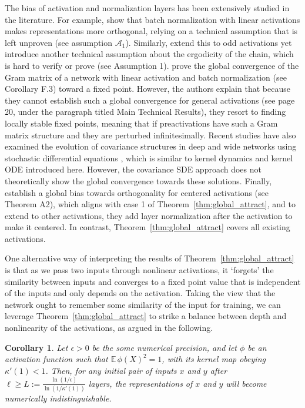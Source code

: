 \documentclass[twoside]{article}
\newcommand{\E}{\mathbb{E}\,}
\newtheorem{corollary}{Corollary}
\theoremstyle{definition}
\begin{document}
The bias of activation and normalization layers has been extensively studied in the literature. For example, \citet{daneshmand2021batch} show that batch normalization with linear activations makes representations more orthogonal, relying on a technical assumption that is left unproven (see assumption $\mathcal{A}_1$). Similarly, \citet{joudaki2023bridging} extend this to odd activations yet introduce another technical assumption about the ergodicity of the chain, which is hard to verify or prove (see Assumption 1). \citet{yang2019meanfield} prove the global convergence of the Gram matrix of a network with linear activation and batch normalization (see Corollary F.3) toward a fixed point. However, the authors explain that because they cannot establish such a global convergence for general activations (see page 20, under the paragraph titled Main Technical Results), they resort to finding locally stable fixed points, meaning that if preactivations have such a Gram matrix structure and they are perturbed infinitesimally. Recent studies have also examined the evolution of covariance structures in deep and wide networks using stochastic differential equations \citep{li2022neural}, which is similar to kernel dynamics and kernel ODE introduced here. However, the covariance SDE approach does not theoretically show the global convergence towards these solutions. Finally, \citet{joudaki2023impact} establish a global bias towards orthogonality for centered activations (see Theorem A2), which aligns with case 1 of Theorem~\ref{thm:global_attract}, and to extend to other activations, they add layer normalization after the activation to make it centered. In contrast, Theorem~\ref{thm:global_attract} covers all existing activations. 

One alternative way of interpreting the results of Theorem~\ref{thm:global_attract} is that as we pass two inputs through nonlinear activations, it `forgets' the similarity between inputs and converges to a fixed point value that is independent of the inputs and only depends on the activation. Taking the view that the network ought to remember some similarity of the input for training, we can leverage Theorem~\ref{thm:global_attract} to strike a balance between depth and nonlinearity of the activations, as argued in the following.

\begin{corollary}
\label{cor:convergence_precision}
Let $\epsilon > 0$ be the some numerical precision, and let $\phi$ be an activation function such that $\E\phi(X)^2=1$, with its kernel map obeying $\kappa'(1) < 1$. Then, for any initial pair of inputs $x$ and $y$ after $\ell \ge L:= \frac{\ln(1/\epsilon)}{\ln(1/\kappa'(1))}$ layers, the representations of $x$ and $y$ will become numerically indistinguishable.
\end{corollary}
\end{document}
